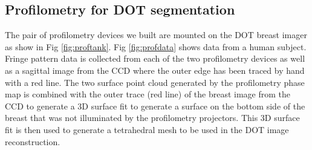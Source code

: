 \subsection{Profilometry for DOT segmentation}
The pair of profilometry devices we built are mounted on the DOT breast imager as show in Fig \ref{fig:proftank}. Fig \ref{fig:profdata} shows data from a human subject. Fringe pattern data is collected from each of the two profilometry devices as well as a sagittal image from the CCD where the outer edge has been traced by hand with a red line. The two surface point cloud generated by the profilometry phase map is combined with the outer trace (red line) of the breast image from the CCD to generate a 3D surface fit to generate a surface on the bottom side of the breast that was not illuminated by the profilometry projectors. This 3D surface fit is then used to generate a tetrahedral mesh to be used in the DOT image reconstruction.

